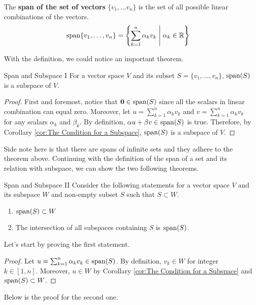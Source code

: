\documentclass[../main.tex]{subfiles}
\begin{document}
\begin{definition}
The \textbf{span of the set of vectors} $\{ v_1, \ldots v_n \}$ is
the set of all possible linear combinations of the vectors.
\[
\operatorname{span}\{v_1, \ldots, v_n\}
= \left\{
    \sum_{k = 1}^n \alpha_k v_k \; \middle|\; \alpha_k \in \mathbb{R}
\right\}
\]
\end{definition}

With the definition, we could notice an important theorem.

\begin{theorem}{Span and Subspace I}
For a vector space $V$ and its subset $S = \{ v_1, \ldots, v_n \}$,
$\operatorname{span}(S)$ is a subspace of $V$.
\end{theorem}
\begin{proof}
First and foremost, notice that $\mathbf{0} \in \operatorname{span}(S)$ since all
the scalars in linear combination can equal zero. Moreover, let $u =
\sum_{k = 1}^n \alpha_k v_k$ and $v = \sum_{k = 1}^n \alpha_k v_k$ for
any scalars $\alpha_k$ and $\beta_k$. By definition, $\alpha u +
\beta v \in \operatorname{span}(S)$ is true. Therefore, by Corollary
\ref{cor:The Condition for a Subspace}, $\operatorname{span}(S)$ is a subspace of
$V$.
\end{proof}

Side note here is that there are spans of infinite sets and they
adhere to the theorem above. Continuing with the definition of the
span of a set and its relation with subspace, we can show the two
following theorems.

\begin{theorem}{Span and Subspace II}
Consider the following statements for a vector space $V$ and its
subspace $W$ and non-empty subset $S$ such that $S \subset W$.
\begin{enumerate}[noitemsep]
\item $\operatorname{span}(S) \subset W$
\item The intersection of all subspaces containing $S$ is $\operatorname{span}(S)$.
\end{enumerate}
\end{theorem}

Let's start by proving the first statement.

\begin{proof}
Let $u = \sum_{k = 1}^n \alpha_k v_k \in \operatorname{span}(S)$. By definition,
$v_k \in W$ for integer $k \in [1, n]$. Moreover, $u \in W$ by
Corollary \ref{cor:The Condition for a Subspace} and $\operatorname{span}(S)
\subset W$.
\end{proof}

Below is the proof for the second one.
\end{document}
